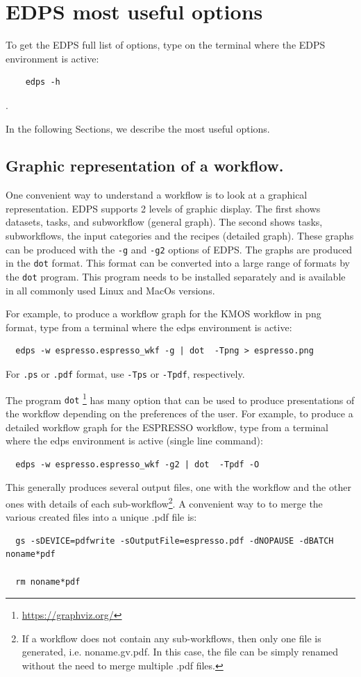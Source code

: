 \section{EDPS most useful options}
To get the EDPS full list of options, type on the terminal where the EDPS environment is active: 
\begin{verbatim}
    edps -h
\end{verbatim}. 

In the following Sections, we describe the most useful options.

\subsection{Graphic representation of a workflow.}
\label{sec:edps_graphic}

One convenient way to understand a workflow is to look at a graphical representation. EDPS supports 2 levels of graphic display. The first shows datasets, tasks, and subworkflow (general graph). The second shows tasks, subworkflows, the input categories and the recipes (detailed graph). These graphs can be produced with the {\tt -g} and {\tt -g2} options of EDPS. The graphs are produced in the {\tt dot} format. This format can be converted into a large range of formats by the {\tt dot} program. This program needs to be installed separately and is available in all commonly used Linux and MacOs versions.

For example, to produce a workflow graph  for the KMOS workflow in png format, type from a terminal where the edps environment is active:

\begin{verbatim}
  edps -w espresso.espresso_wkf -g | dot  -Tpng > espresso.png
\end{verbatim}

For {\tt .ps} or  {\tt .pdf} format, use {\tt -Tps} or {\tt -Tpdf}, respectively.

 The program {\tt dot} \footnote{\url{https://graphviz.org/}} has many option that can be used to produce presentations of the workflow depending on the preferences of the user. 
For example, to produce a detailed workflow graph for the ESPRESSO workflow, type from a terminal where the edps environment is active (single line command):
\begin{verbatim}
  edps -w espresso.espresso_wkf -g2 | dot  -Tpdf -O 
\end{verbatim}

This generally produces several output files, one with the workflow and the  other ones with details  of each sub-workflow\footnote{If a workflow does not contain any sub-workflows, then only one file is generated, i.e. noname.gv.pdf. In this case, the file can be simply renamed without the need to merge multiple .pdf files.}. A convenient way to to merge the various created files into a unique .pdf file is:
\begin{verbatim}
  gs -sDEVICE=pdfwrite -sOutputFile=espresso.pdf -dNOPAUSE -dBATCH noname*pdf
  
  rm noname*pdf
\end{verbatim}


